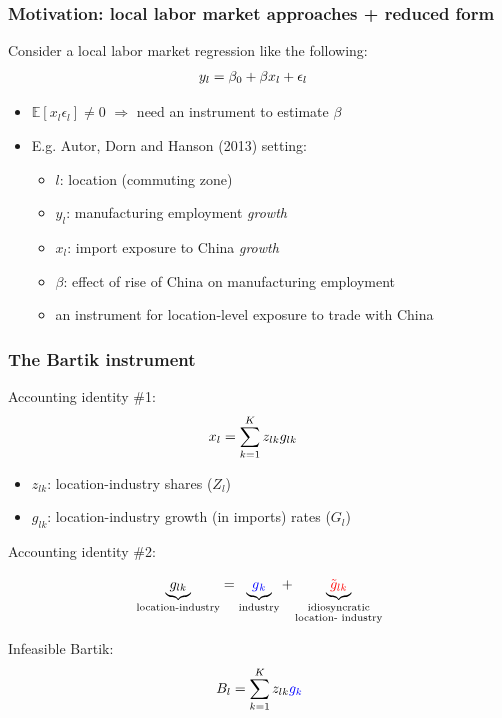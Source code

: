 \documentclass[notes,11pt, aspectratio=169]{beamer}
\begin{document}
\begin{frame}
  \frametitle{Motivation: local labor market approaches + reduced form}

  Consider a local labor market regression like the following:  
  \begin{align}
    y_l &= \beta_0 + \beta x_l + \epsilon_l \notag 
  \end{align}

  \begin{itemize}
    \setlength\itemsep{1em}
  \item $\mathbb{E}[x_l\epsilon_l] \neq 0$   $\Rightarrow$ need an instrument to estimate $\beta$ 
  \item E.g. Autor, Dorn and Hanson (2013) setting:
    \begin{itemize}
      \setlength\itemsep{1em}
    \item $l$: location (commuting zone)
    \item $y_l$: manufacturing employment \textit{growth}
    \item  $x_l$: import exposure to China \textit{growth}
    \item $\beta$: effect of rise of China on manufacturing employment
    \item an instrument for location-level exposure to trade with China
    \end{itemize}
\end{itemize}


\end{frame}


\begin{frame}
\frametitle{The Bartik instrument}

Accounting identity \#1:
\begin{align}
  x_l &=  \sum_{k=1}^{K} z_{lk} g_{lk} \notag  
\end{align}
\begin{itemize}
\setlength\itemsep{1em}
  \item $z_{lk}$: location-industry shares  ($Z_l$)
  \item $g_{lk} $: location-industry growth (in imports) rates ($G_l$) 
  \end{itemize}
Accounting identity \#2:

$$\underbrace{ g_{lk}}_{\text{location-industry}} = \underbrace{  \textcolor{blue}{g}_{ \textcolor{blue}{k}}}_{\text{industry}} + \underbrace{  \textcolor{red}{\tilde{g}_{lk}}   }_{\substack{\text{idiosyncratic} \\ \text{location- industry}}} $$ 

Infeasible Bartik:
$$B_l = \sum_{k=1}^{K}z_{lk} \textcolor{blue}{g_{k}}$$

\end{frame}
\end{document}
